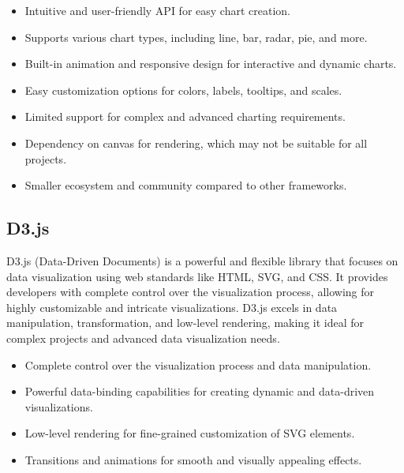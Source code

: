 \documentclass[a4paper, 11pt]{article}
\begin{document}
{\selectfont\large\mdseries\color{MSBlue}{ Main features:}}
\begin{itemize}[noitemsep,nolistsep]
  \item Intuitive and user-friendly API for easy chart creation.
  \item Supports various chart types, including line, bar, radar, pie, and more.
  \item Built-in animation and responsive design for interactive and dynamic charts.
  \item Easy customization options for colors, labels, tooltips, and scales.
\end{itemize}\par

\medbreak
{\selectfont\large\mdseries\color{MSBlue}{ Main cons:}}
\begin{itemize}[noitemsep,nolistsep]
  \item Limited support for complex and advanced charting requirements.
  \item Dependency on canvas for rendering, which may not be suitable for all projects.
  \item Smaller ecosystem and community compared to other frameworks.
\end{itemize}
    
\subsection{D3.js}
D3.js (Data-Driven Documents) is a powerful and flexible library that focuses on data visualization using web standards like HTML, SVG, and CSS. It provides developers with complete control over the visualization process, allowing for highly customizable and intricate visualizations. D3.js excels in data manipulation, transformation, and low-level rendering, making it ideal for complex projects and advanced data visualization needs.\par
\medbreak


{\selectfont\large\mdseries\color{MSBlue}{ Main features:}}
\begin{itemize}[noitemsep,nolistsep]
  \item Complete control over the visualization process and data manipulation.
  \item Powerful data-binding capabilities for creating dynamic and data-driven visualizations.
  \item Low-level rendering for fine-grained customization of SVG elements.
  \item Transitions and animations for smooth and visually appealing effects.
\end{itemize}\par
\end{document}

